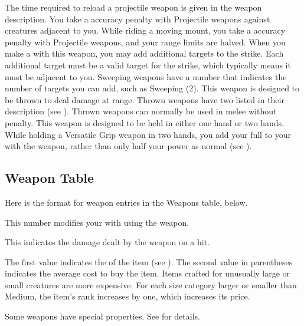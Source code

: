     The time required to reload a projectile weapon is given in the weapon description.
    You take a  accuracy penalty with Projectile weapons against creatures adjacent to you.
    While riding a moving mount, you take a  accuracy penalty with Projectile weapons, and your range limits are halved.
    \label{Sweeping} When you make a   with this weapon, you may add additional targets to the strike.
    Each additional target must be a valid target for the strike, which typically means it must be adjacent to you.
    Sweeping weapons have a number that indicates the number of targets you can add, such as Sweeping (2).
     This weapon is designed to be thrown to deal damage at range.
    Thrown weapons have two  listed in their description (see ).
    Thrown weapons can normally be used in melee without penalty.
     This weapon is designed to be held in either one hand or two hands.
    While holding a Versatile Grip weapon in two hands, you add your full  to your  with the weapon, rather than only half your power as normal (see ).

  \subsection{Weapon Table}
    Here is the format for weapon entries in the Weapons table, below.

     This number modifies your  with  using the weapon.

     This  indicates the damage dealt by the weapon on a hit.

     The first value indicates the  of the item (see ).
    The second value in parentheses indicates the average cost to buy the item.
    Items crafted for unusually large or small creatures are more expensive.
    For each size category larger or smaller than Medium, the item's rank increases by one, which increases its price.

     Some weapons have special properties. See  for details.

